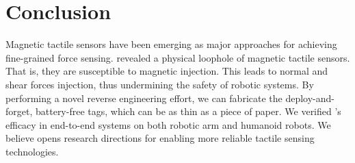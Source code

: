 \section{Conclusion}
\label{sec:conclusion}
Magnetic tactile sensors have been emerging as major approaches for achieving fine-grained force sensing. 
{\name} revealed a physical loophole of magnetic tactile sensors. That is, they are susceptible to magnetic injection. 
This leads to normal and shear forces injection, thus undermining the safety of robotic systems.
By performing a novel reverse engineering effort, we can fabricate the deploy-and-forget, battery-free tags, which can be as thin as a piece of paper.
We verified {\name}'s efficacy in end-to-end systems on both robotic arm and humanoid robots.
We believe {\name} opens research directions for enabling more reliable tactile sensing technologies.
